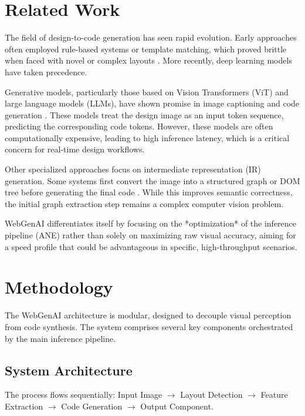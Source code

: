\documentclass[11pt,a4paper]{article}
\begin{document}
\section{Related Work}
The field of design-to-code generation has seen rapid evolution. Early approaches often employed rule-based systems or template matching, which proved brittle when faced with novel or complex layouts \cite{rule_based_systems}. More recently, deep learning models have taken precedence.

Generative models, particularly those based on Vision Transformers (ViT) and large language models (LLMs), have shown promise in image captioning and code generation \cite{code_generation_llm}. These models treat the design image as an input token sequence, predicting the corresponding code tokens. However, these models are often computationally expensive, leading to high inference latency, which is a critical concern for real-time design workflows.

Other specialized approaches focus on intermediate representation (IR) generation. Some systems first convert the image into a structured graph or DOM tree before generating the final code \cite{dom_tree_generation}. While this improves semantic correctness, the initial graph extraction step remains a complex computer vision problem.

WebGenAI differentiates itself by focusing on the *optimization* of the inference pipeline (ANE) rather than solely on maximizing raw visual accuracy, aiming for a speed profile that could be advantageous in specific, high-throughput scenarios.

\section{Methodology}
The WebGenAI architecture is modular, designed to decouple visual perception from code synthesis. The system comprises several key components orchestrated by the main inference pipeline.

\subsection{System Architecture}
The process flows sequentially: Input Image $\rightarrow$ Layout Detection $\rightarrow$ Feature Extraction $\rightarrow$ Code Generation $\rightarrow$ Output Component.
\end{document}
